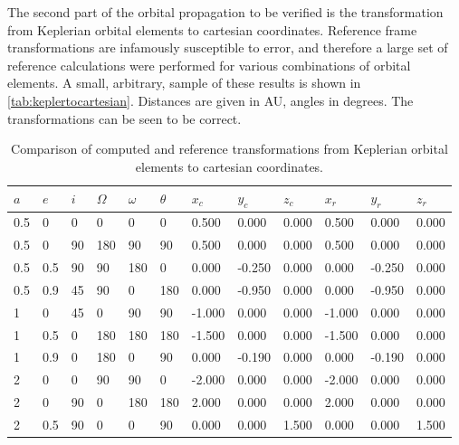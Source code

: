 The second part of the orbital propagation to be verified is the transformation from Keplerian orbital elements to cartesian coordinates. Reference frame transformations are infamously susceptible to error, and therefore a large set of reference calculations were performed for various combinations of orbital elements. A small, arbitrary, sample of these results is shown in \autoref{tab:keplertocartesian}. Distances are given in AU, angles in degrees. The transformations can be seen to be correct.\\

\begin{table}[htbp]
\centering
\caption{Comparison of computed and reference transformations from Keplerian orbital elements to cartesian coordinates.}
\label{tab:keplertocartesian}
\begin{tabular}{llllll|lll|lll}
$a$   & $e$   & $i$  & $\Omega$ & $\omega$ & $\theta$ & $x_c$      & $y_c$      & $z_c$     & $x_r$  & $y_r$  & $z_r$ \\ \hline
0.5 & 0   & 0  & 0    & 0       & 0     & 0.500  & 0.000  & 0.000 & 0.500  & 0.000  & 0.000 \\
0.5 & 0   & 90 & 180  & 90      & 90    & 0.500  & 0.000  & 0.000 & 0.500  & 0.000  & 0.000 \\
0.5 & 0.5 & 90 & 90   & 180     & 0     & 0.000  & -0.250 & 0.000 & 0.000  & -0.250 & 0.000 \\
0.5 & 0.9 & 45 & 90   & 0       & 180   & 0.000  & -0.950 & 0.000 & 0.000  & -0.950 & 0.000 \\
1   & 0   & 45 & 0    & 90      & 90    & -1.000 & 0.000  & 0.000 & -1.000 & 0.000  & 0.000 \\
1   & 0.5 & 0  & 180  & 180     & 180   & -1.500 & 0.000  & 0.000 & -1.500 & 0.000  & 0.000 \\
1   & 0.9 & 0  & 180  & 0       & 90    & 0.000  & -0.190 & 0.000 & 0.000  & -0.190 & 0.000 \\
2   & 0   & 0  & 90   & 90      & 0     & -2.000 & 0.000  & 0.000 & -2.000 & 0.000  & 0.000 \\
2   & 0   & 90 & 0    & 180     & 180   & 2.000  & 0.000  & 0.000 & 2.000  & 0.000  & 0.000 \\
2   & 0.5 & 90 & 0    & 0       & 90    & 0.000  & 0.000  & 1.500 & 0.000  & 0.000  & 1.500
\end{tabular}
\end{table}

